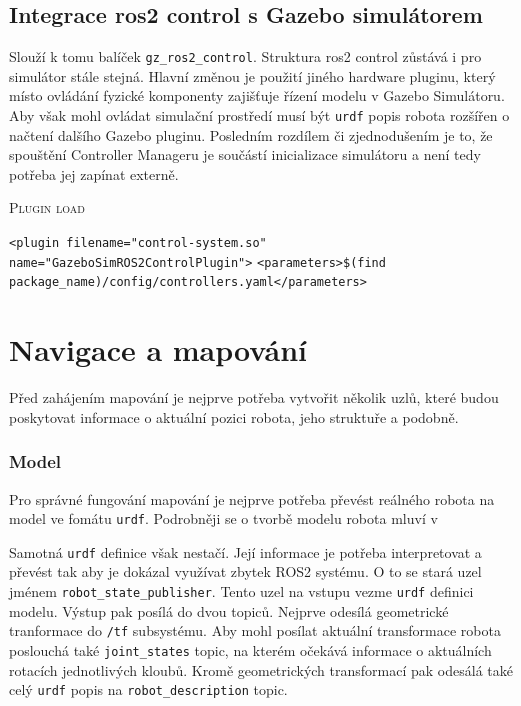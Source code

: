 \subsection{Integrace ros2 control s Gazebo simulátorem}
Slouží k tomu balíček \verb|gz_ros2_control|. Struktura ros2 control zůstává i pro simulátor stále stejná. Hlavní změnou je použití jiného hardware pluginu, který místo ovládání fyzické komponenty zajišťuje řízení modelu v Gazebo Simulátoru. Aby však mohl ovládat simulační prostředí musí být \verb|urdf| popis robota rozšířen o načtení dalšího Gazebo pluginu. Posledním rozdílem či zjednodušením je to, že spouštění Controller Manageru je součástí inicializace simulátoru a není tedy potřeba jej zapínat externě.

\begin{algorithm}[h!]
	\label{}
	\caption{\textsc{Plugin load}}
	
	\DontPrintSemicolon
	\SetAlgoNoLine
	\SetNlSty{}{}{:}
	\SetNlSkip{-1.1em}
	
	\BlankLine \Indp\Indpp
	
	\texttt{<plugin filename="control-system.so" name="GazeboSimROS2ControlPlugin">}\;
	\Indp
	\texttt{<parameters>\$(find package\_name)/config/controllers.yaml</parameters>}\;
	
\end{algorithm}


\section*{Navigace a mapování}


Před zahájením mapování je nejprve potřeba vytvořit několik uzlů, které budou poskytovat informace o aktuální pozici robota, jeho struktuře a podobně.

\subsubsection*{Model}
Pro správné fungování mapování je nejprve potřeba převést reálného robota na model ve fomátu \verb|urdf|. Podrobněji se o tvorbě modelu robota mluví v %

Samotná \verb|urdf| definice však nestačí. Její informace je potřeba interpretovat a převést tak aby je dokázal využívat zbytek ROS2 systému. O to se stará uzel jménem \verb|robot_state_publisher|. Tento uzel na vstupu vezme \verb|urdf| definici modelu. Výstup pak posílá do dvou topiců. Nejprve odesílá geometrické tranformace do \verb|/tf| subsystému. Aby mohl posílat aktuální transformace robota poslouchá také \verb|joint_states| topic, na kterém očekává informace o aktuálních rotacích jednotlivých kloubů. Kromě geometrických transformací pak odesálá také celý \verb|urdf| popis na \verb|robot_description| topic.

